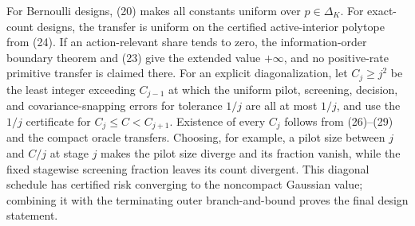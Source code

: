For Bernoulli designs, (20) makes all constants uniform over \(p\in\Delta_K\).  For exact-count designs, the transfer is uniform on the certified active-interior polytope from (24).  If an action-relevant share tends to zero, the information-order boundary theorem and (23) give the extended value \(+\infty\), and no positive-rate primitive transfer is claimed there.  For an explicit diagonalization, let \(C_j\geq j^2\) be the least integer exceeding \(C_{j-1}\) at which the uniform pilot, screening, decision, and covariance-snapping errors for tolerance \(1/j\) are all at most \(1/j\), and use the \(1/j\) certificate for \(C_j\leq C<C_{j+1}\).  Existence of every \(C_j\) follows from (26)--(29) and the compact oracle transfers.  Choosing, for example, a pilot size between \(j\) and \(C/j\) at stage \(j\) makes the pilot size diverge and its fraction vanish, while the fixed stagewise screening fraction leaves its count divergent.  This diagonal schedule has certified risk converging to the noncompact Gaussian value; combining it with the terminating outer branch-and-bound proves the final design statement.